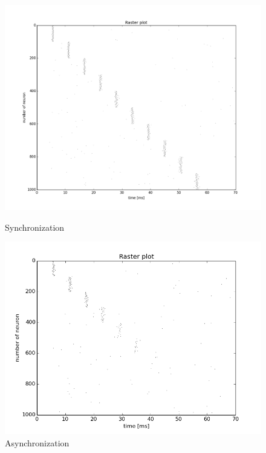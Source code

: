 \documentclass[12pt,a4paper, bibliography=totoc, listof=numbered, footexclude, BCOR=8.25mm, twoside]{scrartcl}
\begin{document}
	\begin{figure}[H]
	    	\begin{minipage}[hbt]{8.2 cm}
	  		\centering
	  		 
	  		  \includegraphics[width=1.0\linewidth]{./Plots/Our_Plots/rasterplot}
	  		  \caption{Synchronization}
	  		  \label{fig:rasterplot}
	    		
	    	\end{minipage}
  	    	\hfill
	    	\begin{minipage}[hbt]{8.2 cm}

	    \centering
	    \includegraphics[width=1.0\linewidth]{./Plots/Our_Plots/asynchronization_rasterplot}
	    \caption{Asynchronization}
	    \label{fig:asynchronization_rasterplot}
	    	\end{minipage}
	    	\end{figure}
\end{document}
